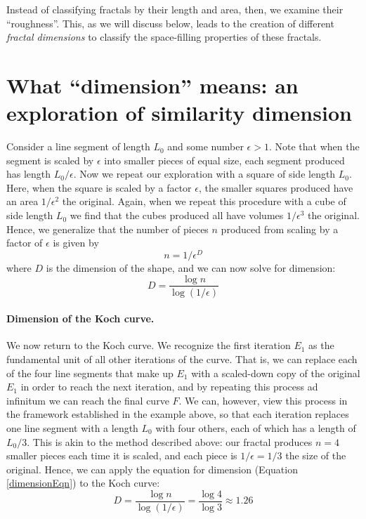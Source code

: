 Instead of classifying fractals by their length and area, then, we examine their ``roughness''. This, as we will discuss below, leads to the creation of different \textit{fractal dimensions} to classify the space-filling properties of these fractals.

\section{What ``dimension'' means: an exploration of similarity dimension}
Consider a line segment of length $ L_0 $ and some number $\epsilon > 1$. Note that when the segment is scaled by $\epsilon$ into smaller pieces of equal size, each segment produced has length $L_0/\epsilon$. Now we repeat our exploration with a square of side length $ L_0 $. Here, when the square is scaled by a factor $\epsilon$, the smaller squares produced have an area $1/\epsilon^2$ the original. Again, when we repeat this procedure with a cube of side length $ L_0 $ we find that the cubes produced all have volumes $1/\epsilon^3$ the original. Hence, we generalize that the number of pieces $n$ produced from scaling by a factor of $\epsilon$ is given by 
\begin{equation}
n = 1/\epsilon^D
\end{equation}
where $D$ is the dimension of the shape, and we can now solve for dimension:
\begin{equation}\label{dimensionEqn}
 D = \frac{\log{n}}{\log{(1/\epsilon)}}
\end{equation}

\paragraph{Dimension of the Koch curve.} We now return to the Koch curve. We recognize the first iteration $E_1$ as the fundamental unit of all other iterations of the curve. That is, we can replace each of the four line segments that make up $E_1$ with a scaled-down copy of the original $E_1$ in order to reach the next iteration, and by repeating this process ad infinitum we can reach the final curve $F$. We can, however, view this process in the framework established in the example above, so that each iteration replaces one line segment with a length $L_0$ with four others, each of which has a length of $L_0/3$. This is akin to the method described above: our fractal produces $n = 4$ smaller pieces each time it is scaled, and each piece is $1/\epsilon = 1/3$ the size of the original. Hence, we can apply the equation for dimension (Equation \ref{dimensionEqn}) to the Koch curve:
\begin{equation}
D = \frac{\log{n}}{\log{(1/\epsilon)}} = \frac{\log{4}}{\log{3}} \approx 1.26
\end{equation}

